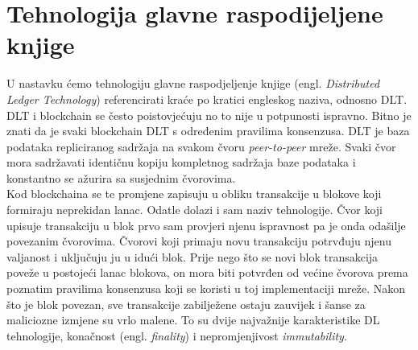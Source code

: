 \documentclass[times, utf8, zavrsni, numeric]{fer}
\begin{document}
\chapter{Tehnologija glavne raspodijeljene knjige}
U nastavku ćemo tehnologiju glavne raspodjeljenje knjige (engl. \emph{Distributed Ledger Technology})
 referencirati kraće po kratici engleskog naziva, odnosno DLT. \\ 
DLT i blockchain se često poistovjećuju no to nije u potpunosti ispravno. Bitno je znati da je 
svaki blockchain DLT s određenim pravilima konsenzusa.
DLT je baza podataka repliciranog sadržaja na svakom čvoru \emph{peer-to-peer} mreže. Svaki čvor
mora sadržavati identičnu kopiju kompletnog sadržaja baze podataka i konstantno se ažurira sa susjednim čvorovima. \\
Kod blockchaina se te promjene zapisuju u obliku transakcije u blokove koji formiraju neprekidan lanac.
Odatle dolazi i sam naziv tehnologije. Čvor koji upisuje transakciju u blok prvo sam provjeri njenu ispravnost pa je onda odašilje povezanim čvorovima.
Čvorovi koji primaju novu transakciju potrvđuju njenu valjanost i uključuju ju u idući blok. Prije nego što se novi blok transakcija poveže u postojeći lanac
blokova, on mora biti potvrđen od većine čvorova prema poznatim pravilima konsenzusa koji se koristi
u toj implementaciji mreže. Nakon što je blok povezan, sve transakcije zabilježene ostaju zauvijek i
šanse za maliciozne izmjene su vrlo malene. To su dvije najvažnije karakteristike DL tehnologije, konačnost (engl. \emph{finality}) i nepromjenjivost \emph{immutability}.
\end{document}

